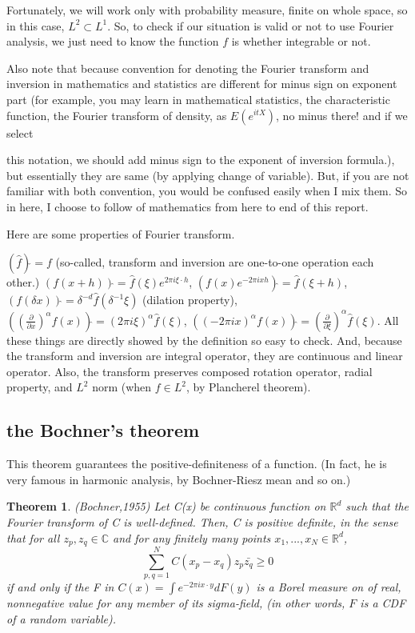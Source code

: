 \documentclass{article}
\newtheorem*{theorem}{Theorem}
\begin{document}
Fortunately, we will work only with probability measure, finite on whole space, so in this case, $L^2 \subset L^1$.
So, to check if our situation is valid or not to use Fourier analysis, we just need to know the function $f$ is whether integrable or not.

Also note that because convention for denoting the Fourier transform and inversion in mathematics and statistics are different
for minus sign on exponent part (for example, you may learn in mathematical statistics, the characteristic function,
the Fourier transform of density, as $E(e^{itX})$, no minus there! and if we select{ this notation,
we should add minus sign to the exponent of inversion formula.), but essentially they are same (by applying change of variable).
But, if you are not familiar with both convention, you would be confused easily when I mix them.
So in here, I choose to follow of mathematics from here to end of this report.

Here are some properties of Fourier transform.

\((\hat{f})\check{ } = f\) (so-called, transform and inversion are one-to-one operation each other.)
\((f(x+h))\hat{ } = \hat{f}(\xi) e^{2\pi i \xi \cdot h} \), 
\((f(x)e^{-2\pi i xh})\hat{ } = \hat{f}(\xi+h)\), 
\((f(\delta x))\hat{ } = \delta^{-d}\hat{f}(\delta^{-1}\xi)\) (dilation property), 
\(((\frac{\partial}{\partial x})^\alpha f(x))\hat{ } = (2\pi i\xi)^\alpha \hat{f}(\xi)\), 
\(((-2\pi i x)^\alpha f(x))\hat{ } = (\frac{\partial}{\partial \xi})^\alpha \hat{f}(\xi)\).
All these things are directly showed by the definition so easy to check.
And, because the transform and inversion are integral operator, they are continuous and linear operator.
Also, the transform preserves composed rotation operator, radial property, and $L^2$ norm (when $f \in L^2$, by Plancherel theorem).

\subsection{the Bochner's theorem}
This theorem guarantees the positive-definiteness of a function. (In fact, he is very famous in harmonic analysis, by Bochner-Riesz mean and so on.)

\begin{theorem}{(Bochner,1955)}
Let C(x) be continuous function on $\mathbb R^d$ such that the Fourier transform of C is well-defined.
Then, C is positive definite, in the sense that for all $z_p,z_q \in \mathbb C$ and for any finitely many points $x_1,...,x_N \in \mathbb R^d$,
\[\sum_{p,q=1}^{N} C(x_p-x_q) z_p \bar{z_q} \geq 0\]
if and only if the F in \(C(x)=\int e^{-2\pi i x \cdot y}dF(y)\) is a Borel measure on of real, nonnegative value for any member of its sigma-field,
(in other words, $F$ is a CDF of a random variable).


\end{theorem}}
\end{document}
